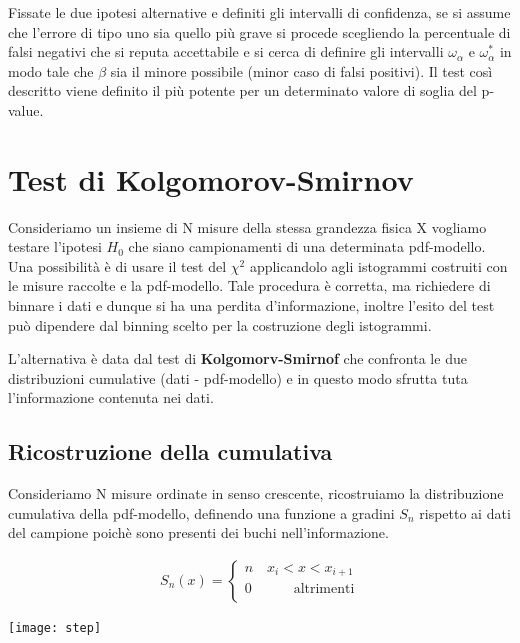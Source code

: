 \noindent Fissate le due ipotesi alternative e definiti gli intervalli di confidenza, se si assume che l'errore di tipo uno sia quello pi\`{u} grave si procede scegliendo la percentuale di falsi negativi che si reputa accettabile e si cerca di definire gli intervalli $\omega_\alpha$ e $\omega_\alpha^*$ in modo tale che $\beta$ sia il minore possibile (minor caso di falsi positivi). Il test cos\`{i} descritto viene definito il pi\`{u} potente per un determinato valore di soglia del p-value.

\section{Test di Kolgomorov-Smirnov}

Consideriamo un insieme di N misure della stessa grandezza fisica X vogliamo testare l'ipotesi $H_0$ che siano campionamenti di una determinata pdf-modello. Una possibilit\`{a} \`{e} di usare il test del $\chi^2$ applicandolo agli istogrammi costruiti con le misure raccolte e la pdf-modello. Tale procedura \`{e} corretta, ma richiedere di binnare i dati e dunque si ha una perdita d'informazione, inoltre l'esito del test pu\`{o} dipendere dal binning scelto per la costruzione degli istogrammi.

L'alternativa \`{e} data dal test di \textbf{Kolgomorv-Smirnof} che confronta le due distribuzioni cumulative (dati - pdf-modello) e in questo modo sfrutta tuta l'informazione contenuta nei dati.


\subsection{Ricostruzione della cumulativa}

Consideriamo N misure ordinate in senso crescente, ricostruiamo la distribuzione cumulativa della pdf-modello, definendo una funzione a gradini $S_n$ rispetto ai dati del campione poich\`{e} sono presenti dei buchi nell'informazione.
\vspace{0.2in}

\begin{minipage}{.4\textwidth}
	\begin{align*}
S_n(x) = 
	\begin{cases}
	n \quad x_i < x < x_{i+1} \\
	0 \quad \quad \quad \text{altrimenti}\\
	\end{cases}
\end{align*}
  \end{minipage}
  \begin{minipage}{.4\textwidth}
    \centering
    \texttt{[image: step]}	
  \end{minipage}
\vspace{0.2in}

